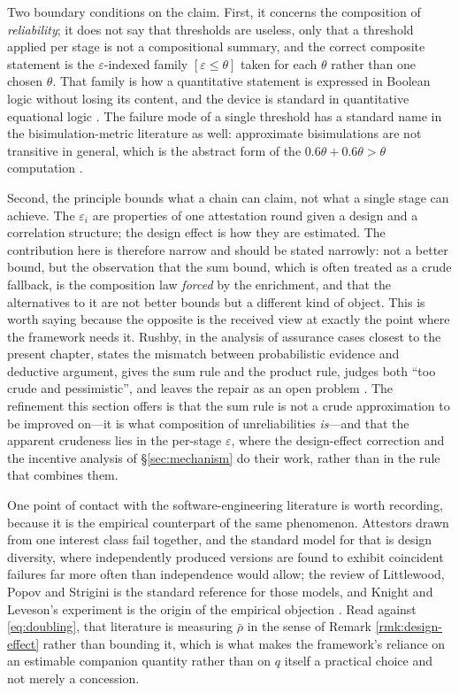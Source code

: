 Two boundary conditions on the claim. First, it concerns the composition of \emph{reliability}; it
does not say that thresholds are useless, only that a threshold applied per stage is not a
compositional summary, and the correct composite statement is the $\varepsilon$-indexed family
$[\varepsilon \leq \theta]$ taken for each $\theta$ rather than one chosen $\theta$. That family is
how a quantitative statement is expressed in Boolean logic without losing its content, and the
device is standard in quantitative equational logic \cite{bacci2023}. The failure mode of a single
threshold has a standard name in the bisimulation-metric literature as well: approximate
bisimulations are not transitive in general, which is the abstract form of the
$0.6\theta + 0.6\theta > \theta$ computation \cite{gebler2013}.

Second, the principle bounds what a chain can claim, not what a single stage can achieve. The
$\varepsilon_i$ are properties of one attestation round given a design and a correlation structure;
the design effect is how they are estimated. The contribution here is therefore narrow and should be
stated narrowly: not a better bound, but the observation that the sum bound, which is often treated
as a crude fallback, is the composition law \emph{forced} by the enrichment, and that the
alternatives to it are not better bounds but a different kind of object. This is worth saying because
the opposite is the received view at exactly the point where the framework needs it. Rushby, in the
analysis of assurance cases closest to the present chapter, states the mismatch between probabilistic
evidence and deductive argument, gives the sum rule and the product rule, judges both ``too crude and
pessimistic'', and leaves the repair as an open problem \cite{rushby2015}. The refinement this
section offers is that the sum rule is not a crude approximation to be improved on---it is what
composition of unreliabilities \emph{is}---and that the apparent crudeness lies in the per-stage
$\varepsilon$, where the design-effect correction and the incentive analysis of \S\ref{sec:mechanism}
do their work, rather than in the rule that combines them.

One point of contact with the software-engineering literature is worth recording, because it is the
empirical counterpart of the same phenomenon. Attestors drawn from one interest class fail together,
and the standard model for that is design diversity, where independently produced versions are found
to exhibit coincident failures far more often than independence would allow; the review of
Littlewood, Popov and Strigini is the standard reference for those models, and Knight and Leveson's
experiment is the origin of the empirical objection \cite{littlewood2001,knight1986}. Read against
\eqref{eq:doubling}, that literature is measuring $\bar\rho$ in the sense of Remark
\ref{rmk:design-effect} rather than bounding it, which is what makes the framework's reliance on an
estimable companion quantity rather than on $q$ itself a practical choice and not merely a
concession.

